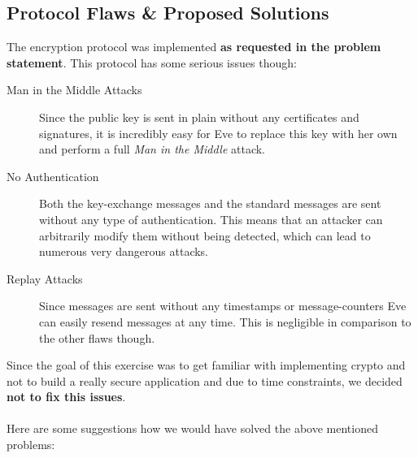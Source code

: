 \documentclass[11pt, a4paper]{article}
\begin{document}
\subsection{Protocol Flaws \& Proposed Solutions}

The encryption protocol was implemented \textbf{as requested in the problem
	statement}. This protocol has some serious issues though:

\begin{description}
	
	\item[Man in the Middle Attacks] Since the public key is sent in plain
	without any certificates and signatures, it is incredibly easy for Eve to
	replace this key with her own and perform a full \textit{Man in the Middle}
	attack.
	
	\item[No Authentication] Both the key-exchange messages and the standard
	messages are sent without any type of authentication. This means that an
	attacker can arbitrarily modify them without being detected, which can
	lead to numerous very dangerous attacks.
	
	\item[Replay Attacks] Since messages are sent without any timestamps or
	message-counters Eve can easily resend messages at any time. This is
	negligible in comparison to the other flaws though.
	
\end{description}

Since the goal of this exercise was to get familiar with implementing crypto
and not to build a really secure application and due to time constraints, we
decided \textbf{not to fix this issues}.
\\\\
Here are some suggestions how we would have solved the above mentioned problems:
\end{document}
